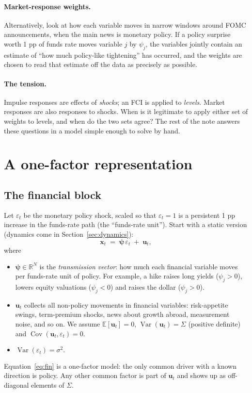 \documentclass[11pt]{article}
\theoremstyle{definition}
\theoremstyle{remark}
\newcommand{\E}{\mathbb{E}}
\newcommand{\Var}{\operatorname{Var}}
\newcommand{\Cov}{\operatorname{Cov}}
\newcommand{\bpsi}{\boldsymbol{\psi}}
\newcommand{\bx}{\mathbf{x}}
\newcommand{\bu}{\mathbf{u}}
\begin{document}
\paragraph{Market-response weights.} Alternatively, look at how each variable moves in narrow windows around FOMC announcements, when the main news is monetary policy. If a policy surprise worth 1 pp of funds rate moves variable $j$ by $\psi_j$, the variables jointly contain an estimate of ``how much policy-like tightening'' has occurred, and the weights are chosen to read that estimate off the data as precisely as possible.

\paragraph{The tension.} Impulse responses are effects of \emph{shocks}; an FCI is applied to \emph{levels}. Market responses are also responses to shocks. When is it legitimate to apply either set of weights to levels, and when do the two sets agree? The rest of the note answers these questions in a model simple enough to solve by hand.

\section{A one-factor representation}

\subsection{The financial block}

Let $\varepsilon_t$ be the monetary policy shock, scaled so that $\varepsilon_t = 1$ is a persistent 1 pp increase in the funds-rate path (the ``funds-rate unit''). Start with a static version (dynamics come in Section~\ref{sec:dynamics}):
\begin{equation}\label{eq:fin}
\bx_t \;=\; \bpsi\,\varepsilon_t \;+\; \bu_t ,
\end{equation}
where
\begin{itemize}[leftmargin=2em]
\item $\bpsi \in \mathbb{R}^N$ is the \emph{transmission vector}: how much each financial variable moves per funds-rate unit of policy. For example, a hike raises long yields ($\psi_j>0$), lowers equity valuations ($\psi_j<0$) and raises the dollar ($\psi_j>0$).
\item $\bu_t$ collects all non-policy movements in financial variables: risk-appetite swings, term-premium shocks, news about growth abroad, measurement noise, and so on. We assume $\E[\bu_t]=0$, $\Var(\bu_t)=\Sigma$ (positive definite) and $\Cov(\bu_t,\varepsilon_t)=0$.
\item $\Var(\varepsilon_t)=\sigma^2$.
\end{itemize}
Equation~\eqref{eq:fin} is a one-factor model: the only common driver with a known direction is policy. Any other common factor is part of $\bu_t$ and shows up as off-diagonal elements of $\Sigma$.
\end{document}
